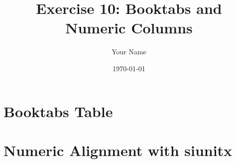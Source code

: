 \documentclass{article}
\title{Exercise 10: Booktabs and Numeric Columns}
\author{Your Name}
\date{\today}
\begin{document}
\maketitle

\section{Booktabs Table}

\section{Numeric Alignment with siunitx}
\end{document}
